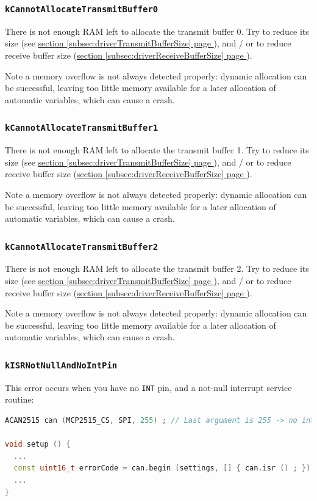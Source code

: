 \documentclass[9pt, a4paper, obeyspaces]{extarticle}
\newcommand\refSubsectionPage[1]{\hyperref[subsec:#1]{section \ref*{subsec:#1} page \pageref{subsec:#1}}}
\newcommand \subsubsectionLabel[2]{\subsubsection{#1}\label{subsubsec:#2}}
\begin{document}
\subsubsectionLabel{\texttt{kCannotAllocateTransmitBuffer0}}{kCannotAllocateTransmitBuffer0}

There is not enough RAM left to allocate the transmit buffer 0. Try to reduce its size (see \refSubsectionPage{driverTransmitBufferSize}), and / or to reduce receive buffer size (\refSubsectionPage{driverReceiveBufferSize}).

Note a memory overflow is not always detected properly: dynamic allocation can be successful, leaving too little memory available for a later allocation of automatic variables, which can cause a crash.



\subsubsectionLabel{\texttt{kCannotAllocateTransmitBuffer1}}{kCannotAllocateTransmitBuffer1}

There is not enough RAM left to allocate the transmit buffer 1. Try to reduce its size (see \refSubsectionPage{driverTransmitBufferSize}), and / or to reduce receive buffer size (\refSubsectionPage{driverReceiveBufferSize}).

Note a memory overflow is not always detected properly: dynamic allocation can be successful, leaving too little memory available for a later allocation of automatic variables, which can cause a crash.




\subsubsectionLabel{\texttt{kCannotAllocateTransmitBuffer2}}{kCannotAllocateTransmitBuffer2}

There is not enough RAM left to allocate the transmit buffer 2. Try to reduce its size (see \refSubsectionPage{driverTransmitBufferSize}), and / or to reduce receive buffer size (\refSubsectionPage{driverReceiveBufferSize}).

Note a memory overflow is not always detected properly: dynamic allocation can be successful, leaving too little memory available for a later allocation of automatic variables, which can cause a crash.





\subsubsectionLabel{\texttt{kISRNotNullAndNoIntPin}}{kISRNotNullAndNoIntPin}

This error occurs when you have no \texttt{INT} pin, and a not-null interrupt service routine: 
{ \small\begin{lstlisting}[language=c++]
ACAN2515 can (MCP2515_CS, SPI, 255) ; // Last argument is 255 -> no interrupt pin

void setup () {
  ...
  const uint16_t errorCode = can.begin (settings, [] { can.isr () ; }) ; // ISR is not null
  ...
}
\end{lstlisting}}
\end{document}
